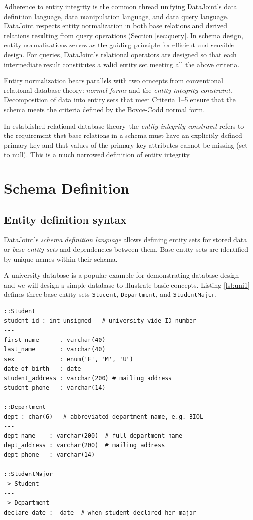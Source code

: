 \documentclass[letter,10pt]{article}
\newcommand{\datajoint}{DataJoint\xspace}
\begin{document}
Adherence to entity integrity is the common thread unifying \datajoint's data definition language, data manipulation language, and data query language. 
\datajoint respects entity normalization in both base relations and derived relations resulting from query operations (Section \ref{sec:query}.  
In schema design, entity normalizations serves as the guiding principle for efficient and sensible design.
For queries, \datajoint's relational operators are designed so that each intermediate result constitutes a valid entity set meeting all the above criteria.

Entity normalization bears parallels with two concepts from conventional relational database theory: \emph{normal forms} and the \emph{entity integrity constraint}.
Decomposition  of data into entity sets that meet Criteria 1--5 ensure that the schema meets the criteria defined by the Boyce-Codd normal form.

In established relational database theory, the \emph{entity integrity constraint} refers to the requirement that base relations in a schema  must have an explicitly defined primary key and that values of the primary key attributes cannot be missing (set to null).  
This is a much narrowed definition of entity integrity.

\section{Schema Definition}\label{sec:def1}
\subsection{Entity definition syntax}
\datajoint's  \emph{schema definition language} allows defining entity sets for stored data or \emph{base entity sets} and dependencies between them. 
Base entity sets are identified by unique names within their schema. 

A university database is a popular example for demonstrating database design and we will design a simple database to illustrate basic concepts. 
Listing \ref{lst:uni1} defines three base entity sets {\tt Student}, {\tt Department}, and {\tt StudentMajor}.

\begin{lstfloat*}
\begin{lstlisting}[language=dj,caption={University database schema definition (Part 1).},label={lst:uni1}]
::Student     
student_id : int unsigned   # university-wide ID number 
---
first_name      : varchar(40)
last_name       : varchar(40)
sex             : enum('F', 'M', 'U')
date_of_birth   : date
student_address : varchar(200) # mailing address
student_phone   : varchar(14) 

::Department 
dept : char(6)   # abbreviated department name, e.g. BIOL
---
dept_name    : varchar(200)  # full department name
dept_address : varchar(200)  # mailing address
dept_phone   : varchar(14)  

::StudentMajor
-> Student
---
-> Department
declare_date :  date  # when student declared her major  
\end{lstlisting}
\end{lstfloat*}
\end{document}
